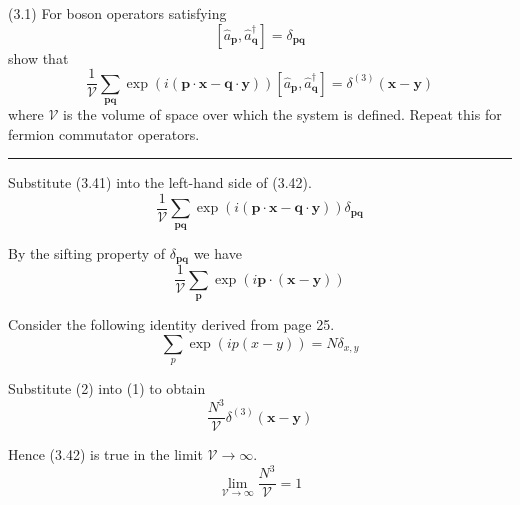 \documentclass[12pt]{article}
\begin{document}
(3.1)
For boson operators satisfying
\begin{equation*}
\left[\hat a_{\mathbf p},\hat a_{\mathbf q}^\dag\right]=\delta_\mathbf{pq}
\tag{3.41}
\end{equation*}
show that
\begin{equation*}
\frac{1}{\mathcal V}\sum_\mathbf{pq}
\exp(i(\mathbf p\cdot\mathbf x-\mathbf q\cdot\mathbf y))
\left[\hat a_{\mathbf p},\hat a_{\mathbf q}^\dag\right]
=\delta^{(3)}(\mathbf x-\mathbf y)
\tag{3.42}
\end{equation*}
where $\mathcal V$ is the volume of space over which the system
is defined.
Repeat this for fermion commutator operators.

\bigskip
\hrule

\bigskip
Substitute (3.41) into the left-hand side of (3.42).
\begin{equation*}
\frac{1}{\mathcal V}\sum_\mathbf{pq}
\exp(i(\mathbf p\cdot\mathbf x-\mathbf q\cdot\mathbf y))
\delta_\mathbf{pq}
\end{equation*}

By the sifting property of $\delta_\mathbf{pq}$ we have
\begin{equation*}
\frac{1}{\mathcal V}\sum_\mathbf{p}
\exp(i\mathbf p\cdot(\mathbf x-\mathbf y))
\tag{1}
\end{equation*}

Consider the following identity derived from page 25.
\begin{equation*}
\sum_p\exp(ip(x-y))=N\delta_{x,y}
\tag{2}
\end{equation*}

Substitute (2) into (1) to obtain
\begin{equation*}
\frac{N^3}{\mathcal V}\delta^{(3)}(\mathbf x-\mathbf y)
\end{equation*}

Hence (3.42) is true in the limit $\mathcal V\rightarrow\infty$.
\begin{equation*}
\lim_{\mathcal V\rightarrow\infty}\frac{N^3}{\mathcal V}=1
\end{equation*}
\end{document}
